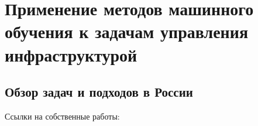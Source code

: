 \chapter{Применение методов машинного обучения к задачам управления инфраструктурой} \label{chapt1}

\section{Обзор задач и подходов в России} \label{sect1_1}






Ссылки на собственные работы:~\cite{vakbib1, confbib1}




